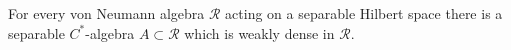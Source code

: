 For every von Neumann algebra $\mathcal{R}$ acting on a separable Hilbert space there is a separable $C^*$-algebra $A \subset \mathcal{R}$ which is weakly dense in $\mathcal{R}$.
